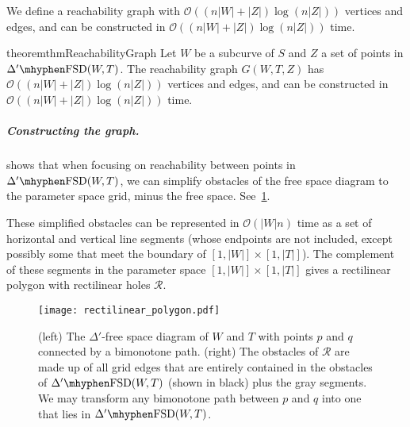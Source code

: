 \documentclass[a4paper,UKenglish,cleveref,thm-restate,notab]{lipics-v2021}
\newcommand{\FSD}[1][\Delta'] {\ensuremath{#1}\mhyphen\mathrm{FSD}}
\newcommand{\bigO}{\mathcal{O}}
\begin{document}
We define a reachability graph with $\bigO((n |W| + |Z|) \log (n|Z|))$ vertices and edges, and can be constructed in $\bigO((n |W| + |Z|) \log (n|Z|))$ time.

    \begin{restatable}{theorem}{thmReachabilityGraph}
    \label{thm:reachability_graph}
        Let $W$ be a subcurve of $S$ and $Z$ a set of points in $\FSD(W, T)$.
        The reachability graph $G(W, T, Z)$ has $\bigO((n |W| + |Z|) \log (n|Z|))$ vertices and edges, and can be constructed in $\bigO((n |W| + |Z|) \log (n|Z|))$ time.
    \end{restatable}


    \subparagraph{Constructing the graph.}
     shows that when focusing on reachability between points in $\FSD(W, T)$, we can simplify obstacles of the free space diagram to the parameter space grid, minus the free space.
    See~\cref{fig:polygon}.
   
    These simplified obstacles can be represented in $\bigO(|W| n)$ time as a set of horizontal and vertical line segments (whose endpoints are not included, except possibly some that meet the boundary of $[1, |W|] \times [1, |T|]$).
    The complement of these segments in the parameter space $[1, |W|] \times [1, |T|]$ gives a rectilinear polygon with rectilinear holes $\mathcal{R}$.

    \begin{figure}
        \centering
        \texttt{[image: rectilinear\_polygon.pdf]}
        \caption{(left) The $\Delta'$-free space diagram of $W$ and $T$ with points $p$ and $q$ connected by a bimonotone path. 
        (right) The obstacles of $\mathcal{R}$ are made up of all grid edges that are entirely contained in the obstacles of $\FSD(W, T)$ (shown in black) plus the gray segments.
        We may transform any bimonotone path between $p$ and $q$ into one that lies in $\FSD(W, T)$.
        }
        \label{fig:polygon}
    \end{figure}
\end{document}
